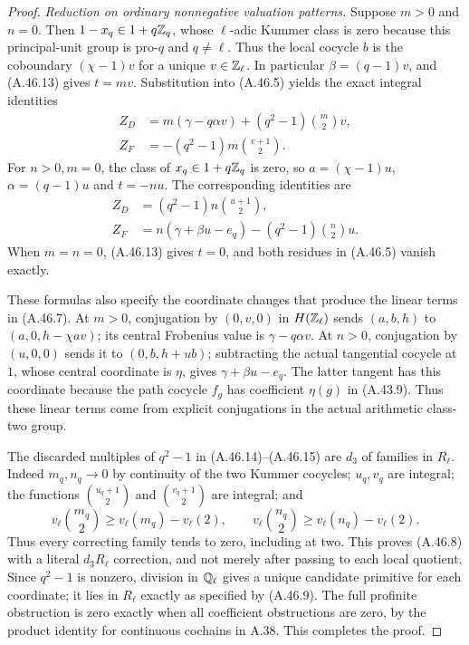 \begin{proof}
\emph{Reduction on ordinary nonnegative valuation patterns.}
Suppose $m>0$ and $n=0$.  Then
$1-x_q\in1+q\mathbb Z_q$, whose $\ell$-adic Kummer class is zero
because this principal-unit group is pro-$q$ and $q\ne\ell$.
Thus the local cocycle $b$ is the coboundary
$(\chi-1)v$ for a unique $v\in\mathbb Z_\ell$.
In particular $\beta=(q-1)v$, and (A.46.13) gives $t=mv$.
Substitution into (A.46.5) yields the exact integral identities
\[
 \begin{split}
 Z_D&=m(\gamma-q\alpha v)
                      +(q^2-1)\binom m2v,\\
 Z_F&=-(q^2-1)m\binom{v+1}{2}.
 \end{split}
 \tag{A.46.14}
\]
For $n>0,m=0$, the class of $x_q\in1+q\mathbb Z_q$ is zero,
so $a=(\chi-1)u$, $\alpha=(q-1)u$ and $t=-nu$.
The corresponding identities are
\[
 \begin{split}
 Z_D&=(q^2-1)n\binom{u+1}{2},\\
 Z_F&=n(\gamma+\beta u-e_q)
                      -(q^2-1)\binom n2u.
 \end{split}
 \tag{A.46.15}
\]
When $m=n=0$, (A.46.13) gives $t=0$, and both residues
in (A.46.5) vanish exactly.

These formulas also specify the coordinate changes that
produce the linear terms in (A.46.7).  At $m>0$, conjugation
by $(0,v,0)$ in $H(\mathbb Z_\ell)$ sends $(a,b,h)$ to
$(a,0,h-\chi av)$; its central Frobenius value is
$\gamma-q\alpha v$.  At $n>0$, conjugation by $(u,0,0)$
sends it to $(0,b,h+ub)$; subtracting the actual tangential
cocycle at $1$, whose central coordinate is $\eta$, gives
$\gamma+\beta u-e_q$.  The latter tangent has this coordinate
because the path cocycle $f_g$ has coefficient $\eta(g)$
in (A.43.9).  Thus these linear terms come from explicit
conjugations in the actual arithmetic class-two group.

The discarded multiples of $q^2-1$ in (A.46.14)--(A.46.15)
are $d_3$ of families in $R_\ell$.  Indeed $m_q,n_q\to0$
by continuity of the two Kummer cocycles; $u_q,v_q$ are
integral; the functions $\binom{u_q+1}{2}$ and
$\binom{v_q+1}{2}$ are integral; and
\[
 v_\ell\!\binom{m_q}{2}\ge v_\ell(m_q)-v_\ell(2),
 \qquad
 v_\ell\!\binom{n_q}{2}\ge v_\ell(n_q)-v_\ell(2).
\]
Thus every correcting family tends to zero, including at
two.  This proves (A.46.8) with a literal $d_3R_\ell$
correction, and not merely after passing to each local
quotient.  Since $q^2-1$ is nonzero, division in $\mathbb Q_\ell$
gives a unique candidate primitive for each coordinate;
it lies in $R_\ell$ exactly as specified by (A.46.9).
The full profinite obstruction is zero exactly when all
coefficient obstructions are zero, by the product identity
for continuous cochains in A.38.  This completes the proof.
\end{proof}

